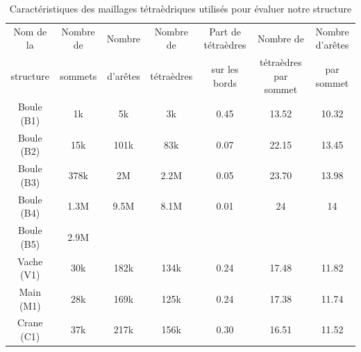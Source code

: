 \begin{table}[H]
\footnotesize
\begin{tabular}{|c | c | c | c | c| c | c |}
\hline
Nom de la & Nombre de & Nombre& Nombre de & Part de tétraèdres & Nombre de & Nombre d'arêtes\\
structure&sommets&d'arêtes &tétraèdres&sur les bords&tétraèdres par sommet & par sommet\\
\hline
Boule (B1) & 1k & 5k & 3k & 0.45 & 13.52 & 10.32 \\
Boule (B2)& 15k & 101k & 83k & 0.07 & 22.15 & 13.45\\
Boule (B3)& 378k & 2M & 2.2M & 0.05 & 23.70 & 13.98 \\
Boule (B4)& 1.3M & 9.5M & 8.1M & 0.01 & 24 & 14 \\
Boule (B5)& 2.9M &  &  &  &  &  \\
Vache (V1)& 30k & 182k & 134k & 0.24 & 17.48 & 11.82 \\
Main (M1)& 28k & 169k & 125k & 0.24 & 17.38 & 11.74\\
Crane (C1)& 37k & 217k & 156k & 0.30 & 16.51 & 11.52 \\ 
\hline  
\end{tabular}
\caption{Caractéristiques des maillages tétraèdriques utilisés pour évaluer notre structure}
\label{tab:caract_maillages}
\end{table}


